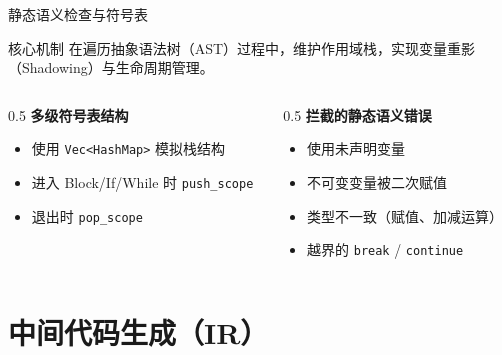 \documentclass[aspectratio=169]{ctexbeamer}
\begin{document}
\begin{frame}{静态语义检查与符号表}
    \begin{block}{核心机制}
        在遍历抽象语法树（AST）过程中，维护作用域栈，实现变量重影（Shadowing）与生命周期管理。
    \end{block}
    \vfill
    \begin{columns}[T]
    \begin{column}{0.5\textwidth}
        \textbf{多级符号表结构}
        \begin{itemize}
            \item 使用 \texttt{Vec<HashMap>} 模拟栈结构
            \item 进入 Block/If/While 时 \texttt{push\_scope}
            \item 退出时 \texttt{pop\_scope}
        \end{itemize}
    \end{column}
    \begin{column}{0.5\textwidth}
        \textbf{拦截的静态语义错误}
        \begin{itemize}
            \item 使用未声明变量
            \item 不可变变量被二次赋值
            \item 类型不一致（赋值、加减运算）
            \item 越界的 \texttt{break} / \texttt{continue}
        \end{itemize}
    \end{column}
    \end{columns}
\end{frame}

\section{中间代码生成（IR）}
\end{document}

